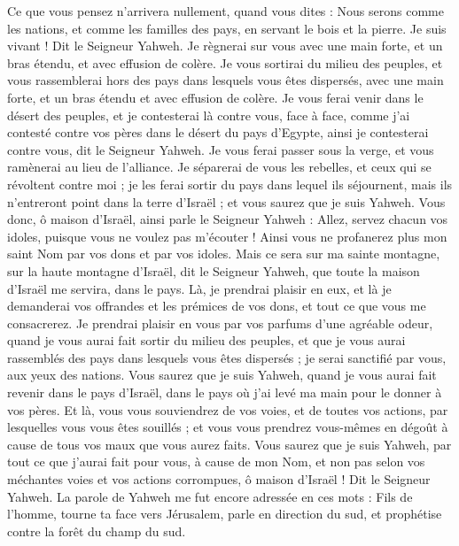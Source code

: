 \begin{multicols}{2}
Ce que vous pensez n'arrivera nullement, quand vous dites : Nous serons comme les nations, et comme les familles des pays, en servant le bois et la pierre.
Je suis vivant ! Dit le Seigneur Yahweh. Je règnerai sur vous avec une main forte, et un bras étendu, et avec effusion de colère.
Je vous sortirai du milieu des peuples, et vous rassemblerai hors des pays dans lesquels vous êtes dispersés, avec une main forte, et un bras étendu et avec effusion de colère.
Je vous ferai venir dans le désert des peuples, et je contesterai là contre vous, face à face,
comme j'ai contesté contre vos pères dans le désert du pays d'Egypte, ainsi je contesterai contre vous, dit le Seigneur Yahweh.
Je vous ferai passer sous la verge, et vous ramènerai au lieu de l'alliance.
Je séparerai de vous les rebelles, et ceux qui se révoltent contre moi ; je les ferai sortir du pays dans lequel ils séjournent, mais ils n'entreront point dans la terre d'Israël ; et vous saurez que je suis Yahweh.
Vous donc, ô maison d'Israël, ainsi parle le Seigneur Yahweh : Allez, servez chacun vos idoles, puisque vous ne voulez pas m'écouter ! Ainsi vous ne profanerez plus mon saint Nom par vos dons et par vos idoles.
Mais ce sera sur ma sainte montagne, sur la haute montagne d'Israël, dit le Seigneur Yahweh, que toute la maison d'Israël me servira, dans le pays. Là, je prendrai plaisir en eux, et là je demanderai vos offrandes et les prémices de vos dons, et tout ce que vous me consacrerez.
Je prendrai plaisir en vous par vos parfums d'une agréable odeur, quand je vous aurai fait sortir du milieu des peuples, et que je vous aurai rassemblés des pays dans lesquels vous êtes dispersés ; je serai sanctifié par vous, aux yeux des nations.
Vous saurez que je suis Yahweh, quand je vous aurai fait revenir dans le pays d'Israël, dans le pays où j'ai levé ma main pour le donner à vos pères.
Et là, vous vous souviendrez de vos voies, et de toutes vos actions, par lesquelles vous vous êtes souillés ; et vous vous prendrez vous-mêmes en dégoût à cause de tous vos maux que vous aurez faits.
Vous saurez que je suis Yahweh, par tout ce que j'aurai fait pour vous, à cause de mon Nom, et non pas selon vos méchantes voies et vos actions corrompues, ô maison d'Israël ! Dit le Seigneur Yahweh.
\VerseOne{}La parole de Yahweh me fut encore adressée en ces mots :
Fils de l'homme, tourne ta face vers Jérusalem, parle en direction du sud, et prophétise contre la forêt du champ du sud.

\end{multicols}
